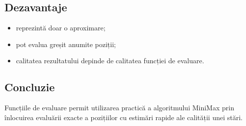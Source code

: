 \documentclass[12pt,a4paper]{article}
\begin{document}
\subsection{Dezavantaje}

\begin{itemize}
\item reprezintă doar o aproximare;
\item pot evalua greșit anumite poziții;
\item calitatea rezultatului depinde de calitatea funcției de evaluare.
\end{itemize}

\subsection{Concluzie}

Funcțiile de evaluare permit utilizarea practică a algoritmului MiniMax prin înlocuirea evaluării exacte a pozițiilor cu estimări rapide ale calității unei stări.
\end{document}
